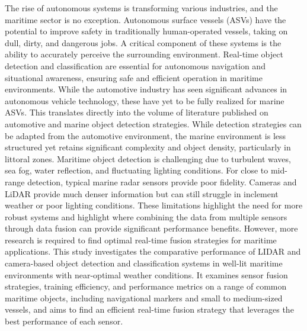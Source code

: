 \documentclass{erauthesis}
\begin{document}
The rise of autonomous systems is transforming various industries, and the maritime sector is no exception. Autonomous surface vessels (ASVs) have the potential to improve safety in traditionally human-operated vessels, taking on dull, dirty, and dangerous jobs.
A critical component of these systems is the ability to accurately perceive the surrounding environment. 
Real-time object detection and classification are essential for autonomous navigation and situational awareness, ensuring safe and efficient operation in maritime environments. 
While the automotive industry has seen significant advances in autonomous vehicle technology, these have yet to be fully realized for marine ASVs.
This translates directly into the volume of literature published on automotive and marine object detection strategies. 
While detection strategies can be adapted from the automotive environment, the marine environment is less structured yet retains significant complexity and object density, particularly in littoral zones.
Maritime object detection is challenging due to turbulent waves, sea fog, water reflection, and fluctuating lighting conditions. 
For close to mid-range detection, typical marine radar sensors provide poor fidelity.
Cameras and LiDAR provide much denser information but can still struggle in inclement weather or poor lighting conditions. 
These limitations highlight the need for more robust systems and highlight where combining the data from multiple sensors through data fusion can provide significant performance benefits. 
However, more research is required to find optimal real-time fusion strategies for maritime applications.
This study investigates the comparative performance of LIDAR and camera-based object detection and classification systems in well-lit maritime environments with near-optimal weather conditions. 
It examines sensor fusion strategies, training efficiency, and performance metrics on a range of common maritime objects, including navigational markers and small to medium-sized vessels, and aims to find an efficient real-time fusion strategy that leverages the best performance of each sensor.


\end{document}
